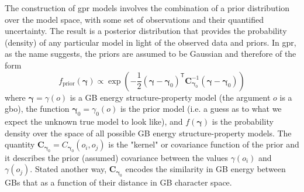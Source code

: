 \documentclass[final,twocolumn,12pt]{elsarticle}
\begin{document}
	The construction of \gls{gpr} models involves the combination of a prior distribution over the model space, with some set of observations and their quantified uncertainty. The result is a posterior distribution that provides the probability (density) of any particular model in light of the observed data and priors. In \gls{gpr}, as the name suggests, the priors are assumed to be Gaussian and therefore of the form
    \begin{equation}
        f_{\text{prior}}\!\left(\boldsymbol{\gamma}\right) \propto \exp{\left(-\frac{1}{2} {\left(\boldsymbol{\gamma}-\boldsymbol{\gamma}_0\right)}^{\mathsf{T}} \mathbf{C}_{\boldsymbol{\gamma}_0}^{-1} {\left(\boldsymbol{\gamma}-\boldsymbol{\gamma}_0\right)}\right)}
    \end{equation}
    where $\boldsymbol{\gamma} = \gamma\!\left(o\right)$ is a GB energy structure-property model (the argument $o$ is a \gls{gbo}), the function $\boldsymbol{\gamma}_0 = \gamma_0\!\left(o\right)$ is the prior model (i.e. a guess as to what we expect the unknown true model to look like), and $f\!\left(\boldsymbol{\gamma}\right)$ is the probability density over the space of all possible GB energy structure-property models. The quantity $\mathbf{C}_{\boldsymbol{\gamma}_0} = C_{\boldsymbol{\gamma}_0}\!\left(o_i,o_j\right)$ is the "kernel" or covariance function of the prior and it describes the prior (assumed) covariance between the values $\gamma\!\left(o_i\right)$ and $\gamma\!\left(o_j\right)$. Stated another way, $\mathbf{C}_{\boldsymbol{\gamma}_0}$ encodes the similarity in GB energy between GBs that as a function of their distance in GB character space.
	
\end{document}
